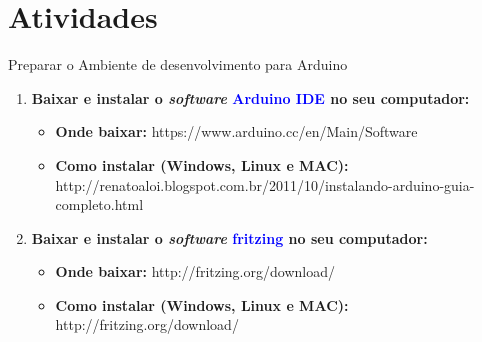 \section{Atividades}
\begin{frame}{Preparar o Ambiente de desenvolvimento para Arduino}
	\begin{enumerate}
		\item \textbf{Baixar e instalar o \textit{software} \textcolor{blue}{Arduino IDE} no seu computador:}
		\begin{itemize}
			\item \textbf{Onde baixar:} https://www.arduino.cc/en/Main/Software
			\item \textbf{Como instalar (Windows, Linux e MAC):} http://renatoaloi.blogspot.com.br/2011/10/instalando-arduino-guia-completo.html
		\end{itemize}
		
		\item \textbf{Baixar e instalar o \textit{software} \textcolor{blue}{fritzing} no seu computador:}
		\begin{itemize}
			\item \textbf{Onde baixar:} http://fritzing.org/download/
			\item \textbf{Como instalar (Windows, Linux e MAC):} http://fritzing.org/download/ 
		\end{itemize}
	\end{enumerate}
\end{frame}
